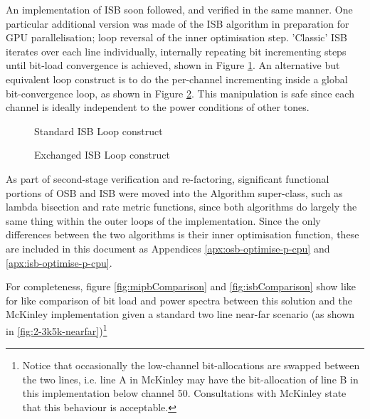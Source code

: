 An implementation of ISB soon followed, and verified in the same manner. One particular additional version was made of the ISB algorithm in preparation for GPU parallelisation; loop reversal of the inner optimisation step. 'Classic' ISB iterates over each line individually, internally repeating bit incrementing steps until bit-load convergence is achieved, shown in Figure \ref{fig:isb-standard-loop}. An alternative but equivalent loop construct is to do the per-channel incrementing inside a global bit-convergence loop, as shown in Figure \ref{fig:isb-alternate-loop}. This manipulation is safe since each channel is ideally independent to the power conditions of other tones.

\begin{figure}[ht!]
  \begin{algorithmic}
      \REPEAT
        \ENDFOR
    \ENDFOR
  \end{algorithmic}
  \caption{Standard ISB Loop construct}
  \label{fig:isb-standard-loop}
\end{figure}

\begin{figure}[ht!]
  \begin{algorithmic}
    \REPEAT
        \ENDFOR
      \ENDFOR
  \end{algorithmic}
  \caption{Exchanged ISB Loop construct}
  \label{fig:isb-alternate-loop}  
\end{figure}

As part of second-stage verification and re-factoring, significant functional portions of OSB and ISB were moved into the Algorithm super-class, such as lambda bisection and rate metric functions, since both algorithms do largely the same thing within the outer loops of the implementation. Since the only differences between the two algorithms is their inner optimisation function, these are included in this document as Appendices \ref{apx:osb-optimise-p-cpu} and \ref{apx:isb-optimise-p-cpu}.

For completeness, figure \ref{fig:mipbComparison} and \ref{fig:isbComparison} show like for like comparison of bit load and power spectra between this solution and the McKinley implementation given a standard two line near-far scenario (as shown in \ref{fig:2-3k5k-nearfar})\footnote{Notice that occasionally the low-channel bit-allocations are swapped between the two lines, i.e. line A in McKinley may have the bit-allocation of line B in this implementation below channel 50. Consultations with McKinley state that this behaviour is acceptable.}

